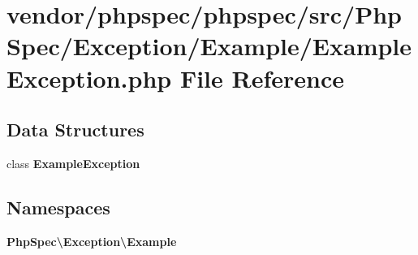 \section{vendor/phpspec/phpspec/src/\+Php\+Spec/\+Exception/\+Example/\+Example\+Exception.php File Reference}
\label{_example_exception_8php}
\subsection*{Data Structures}
\begin{DoxyCompactItemize}
\item 
class {\bf Example\+Exception}
\end{DoxyCompactItemize}
\subsection*{Namespaces}
\begin{DoxyCompactItemize}
\item 
 {\bf Php\+Spec\textbackslash{}\+Exception\textbackslash{}\+Example}
\end{DoxyCompactItemize}
